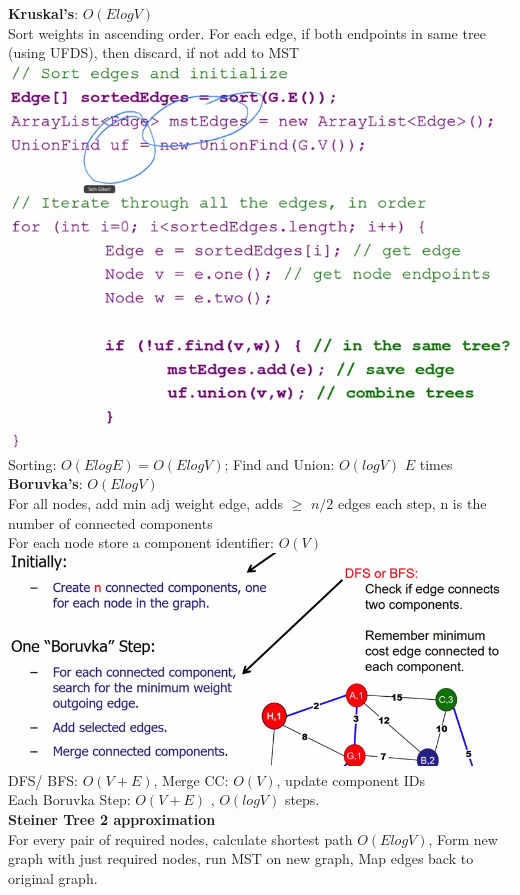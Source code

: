 \documentclass[10pt, a4paper]{article}
\begin{document}
\begin{multicols*}{3}
		\textbf{Kruskal's}: $O(ElogV)$\\
		Sort weights in ascending order.  For each edge, if both endpoints in same tree (using UFDS), then discard, if not add to MST\\ 
		\includegraphics[scale=.22]{Kruskal}\\
		Sorting: $O(ElogE) = O(ElogV)$; Find and Union: $O(logV)$ $E$ times\\
		\textbf{Boruvka's}: $O(ElogV)$\\
		For all nodes, add min adj weight edge, adds $\geq$ $n/2$ edges each step, n is the number of connected components\\
		For each node store a component identifier: $O(V)$\\
		\includegraphics[scale=.21]{Boruvka}\\ 
		DFS/ BFS: $O(V + E)$, Merge CC: $O(V)$, update component IDs\\
		Each Boruvka Step: $O(V + E)$ , $O(logV)$ steps.\\
		\textbf{Steiner Tree 2 approximation}\\
		For every pair of required nodes, calculate shortest path $O(ElogV)$, Form new graph with just required nodes, run MST on new graph, Map edges back to original graph.\\
		

\end{multicols*}
\end{document}
